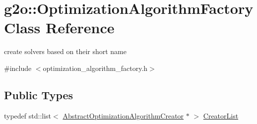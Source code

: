\hypertarget{classg2o_1_1_optimization_algorithm_factory}{}\section{g2o\+:\+:Optimization\+Algorithm\+Factory Class Reference}
\label{classg2o_1_1_optimization_algorithm_factory}


create solvers based on their short name  




{\ttfamily \#include $<$optimization\+\_\+algorithm\+\_\+factory.\+h$>$}

\subsection*{Public Types}
\begin{DoxyCompactItemize}
\item 
typedef std\+::list$<$ \mbox{\hyperlink{classg2o_1_1_abstract_optimization_algorithm_creator}{Abstract\+Optimization\+Algorithm\+Creator}} $\ast$ $>$ \mbox{\hyperlink{classg2o_1_1_optimization_algorithm_factory_a3ed210b94bf09b47e30d07da3766b4ec}{Creator\+List}}
\end{DoxyCompactItemize}
